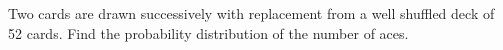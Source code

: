 \begin{flushleft}
Two cards are drawn successively with replacement from a well shuffled deck of 52 cards. Find the probability distribution of the number of aces.
\end{flushleft}